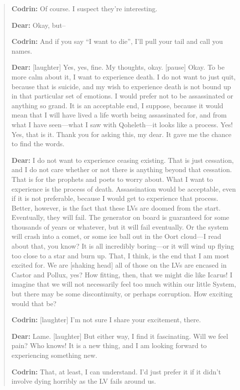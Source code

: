 \begin{quote}
\textbf{Codrin:} Of course. I suspect they're interesting.

\textbf{Dear:} Okay, but--

\textbf{Codrin:} And if you say ``I want to die'', I'll pull your tail and call you names.

\textbf{Dear:} {[}laughter{]} Yes, yes, fine. My thoughts, okay. {[}pause{]} Okay. To be more calm about it, I want to experience death. I do not want to just quit, because that is suicide, and my wish to experience death is not bound up in that particular set of emotions. I would prefer not to be assassinated or anything so grand. It is an acceptable end, I suppose, because it would mean that I will have lived a life worth being assassinated for, and from what I have seen---what I saw with Qoheleth---it looks like a process. Yes! Yes, that is it. Thank you for asking this, my dear. It gave me the chance to find the words.

\textbf{Dear:} I do not want to experience ceasing existing. That is just cessation, and I do not care whether or not there is anything beyond that cessation. That is for the prophets and poets to worry about. What I want to experience is the process of death. Assassination would be acceptable, even if it is not preferable, because I would get to experience that process. Better, however, is the fact that these LVs are doomed from the start. Eventually, they will fail. The generator on board is guaranteed for some thousands of years or whatever, but it will fail eventually. Or the system will crash into a comet, or some ice ball out in the Oort cloud---I read about that, you know? It is all incredibly boring---or it will wind up flying too close to a star and burn up. That, I think, is the end that I am most excited for. We are {[}shaking head{]} all of those on the LVs are encased in Castor and Pollux, yes? How fitting, then, that we might die like Icarus! I imagine that we will not necessarily feel too much within our little System, but there may be some discontinuity, or perhaps corruption. How exciting would that be?

\textbf{Codrin:} {[}laughter{]} I'm not sure I share your excitement, there.

\textbf{Dear:} Lame. {[}laughter{]} But either way, I find it fascinating. Will we feel pain? Who knows! It is a new thing, and I am looking forward to experiencing something new.

\textbf{Codrin:} That, at least, I can understand. I'd just prefer it if it didn't involve dying horribly as the LV fails around us.


\end{quote}
